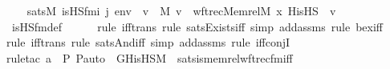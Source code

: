 \begin{isabellebody}
\isanewline
\ \ \isamarkupfalse%
\ {\isachardoublequoteopen}sats{\isacharparenleft}{\kern0pt}M{\isacharcomma}{\kern0pt}\ is{\isacharunderscore}{\kern0pt}HS{\isacharunderscore}{\kern0pt}fm{\isacharparenleft}{\kern0pt}i{\isacharcomma}{\kern0pt}\ j{\isacharparenright}{\kern0pt}{\isacharcomma}{\kern0pt}\ env{\isacharparenright}{\kern0pt}\ {\isasymlongleftrightarrow}\ {\isacharparenleft}{\kern0pt}{\isasymexists}v\ {\isasymin}\ M{\isachardot}{\kern0pt}\ v\ {\isacharequal}{\kern0pt}\ wftrec{\isacharparenleft}{\kern0pt}Memrel{\isacharparenleft}{\kern0pt}M{\isacharparenright}{\kern0pt}{\isacharcircum}{\kern0pt}{\isacharplus}{\kern0pt}{\isacharcomma}{\kern0pt}\ x{\isacharcomma}{\kern0pt}\ His{\isacharunderscore}{\kern0pt}HS{\isacharparenright}{\kern0pt}\ {\isasymand}\ v\ {\isacharequal}{\kern0pt}\ {}{\isacharparenright}{\kern0pt}{\isachardoublequoteclose}\ \isanewline
\ \ \ \ \isamarkupfalse%
\ is{\isacharunderscore}{\kern0pt}HS{\isacharunderscore}{\kern0pt}fm{\isacharunderscore}{\kern0pt}def\ \isanewline
\ \ \ \ \isamarkupfalse%
{\isacharparenleft}{\kern0pt}rule\ iff{\isacharunderscore}{\kern0pt}trans{\isacharcomma}{\kern0pt}\ rule\ sats{\isacharunderscore}{\kern0pt}Exists{\isacharunderscore}{\kern0pt}iff{\isacharcomma}{\kern0pt}\ simp\ add{\isacharcolon}{\kern0pt}assms{\isacharcomma}{\kern0pt}\ rule\ bex{\isacharunderscore}{\kern0pt}iff{\isacharparenright}{\kern0pt}\isanewline
\ \ \ \ \isamarkupfalse%
{\isacharparenleft}{\kern0pt}rule\ iff{\isacharunderscore}{\kern0pt}trans{\isacharcomma}{\kern0pt}\ rule\ sats{\isacharunderscore}{\kern0pt}And{\isacharunderscore}{\kern0pt}iff{\isacharcomma}{\kern0pt}\ simp\ add{\isacharcolon}{\kern0pt}assms{\isacharcomma}{\kern0pt}\ rule\ iff{\isacharunderscore}{\kern0pt}conjI{\isacharparenright}{\kern0pt}\isanewline
\ \ \ \ \ \isamarkupfalse%
{\isacharparenleft}{\kern0pt}rule{\isacharunderscore}{\kern0pt}tac\ a{\isacharequal}{\kern0pt}{\isachardoublequoteopen}{\isacharless}{\kern0pt}{\isasymF}{\isacharcomma}{\kern0pt}\ {\isasymG}{\isacharcomma}{\kern0pt}\ P{\isacharcomma}{\kern0pt}\ P{\isacharunderscore}{\kern0pt}auto{\isachargreater}{\kern0pt}{\isachardoublequoteclose}\ \ G{\isacharequal}{\kern0pt}{\isachardoublequoteopen}His{\isacharunderscore}{\kern0pt}HS{\isacharunderscore}{\kern0pt}M{\isachardoublequoteclose}\ \ sats{\isacharunderscore}{\kern0pt}is{\isacharunderscore}{\kern0pt}memrel{\isacharunderscore}{\kern0pt}wftrec{\isacharunderscore}{\kern0pt}fm{\isacharunderscore}{\kern0pt}iff{\isacharparenright}{\kern0pt}\isanewline

\end{isabellebody}
